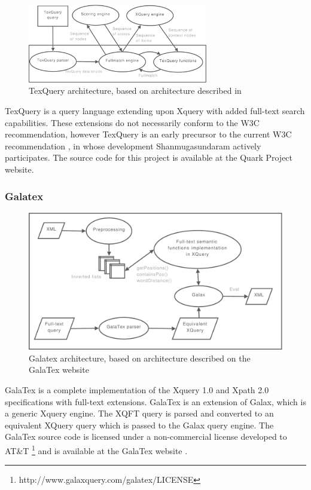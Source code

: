 \begin{figure}[!h]
  \centering
    \includegraphics[width=0.7\textwidth]{diagrams/texquery_arch}
  \caption{TexQuery architecture, based on architecture described in \cite{texquery_fulltextsearch}}
\end{figure}

TexQuery is a query language extending upon Xquery with added full-text search 
capabilities. These extensions do not necessarily conform to the W3C
recommendation, however TexQuery is an early precursor to the current W3C 
recommendation \cite{TEXQ00}, in whose development Shanmugasundaram actively 
participates. The source code for this project is available at the Quark Project
website\cite{quarkproject}.

\subsubsection{Galatex}
\begin{figure}[!h]
  \centering
    \includegraphics[width=1\textwidth]{diagrams/galatex_arch}
  \caption{Galatex architecture, based on architecture described on the GalaTex
  website\cite{galatex}}
\end{figure}

GalaTex is a complete implementation of the Xquery 1.0 and Xpath 2.0
specifications with full-text extensions. GalaTex is an extension of Galax,
which is a generic Xquery engine. The XQFT query is parsed and converted to an
equivalent XQuery query which is passed to the Galax query engine. The GalaTex
source code is licensed under a non-commercial license developed to AT\&{}T 
\footnote{http://www.galaxquery.com/galatex/LICENSE} and is available at the
GalaTex website \cite{galatex}.

